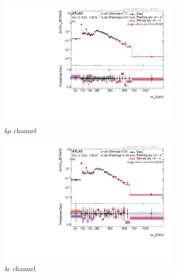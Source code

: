 \begin{figure}[H]
    \begin{subfigure}{.49\textwidth}\centering
      \includegraphics[width=.95\linewidth]{Figures/m4l/UnfoldedResults/linlog_Unfolded_Data_m4l_event_type4mu.pdf}\caption{$4\mu$ channel}\label{fig:sub-first}
    \end{subfigure}
    \begin{subfigure}{.49\textwidth}\centering
      \includegraphics[width=.95\linewidth]{Figures/m4l/UnfoldedResults/linlog_Unfolded_Data_m4l_event_type4e.pdf} \caption{$4e$ channel}\label{fig:sub-second}
    \end{subfigure}
    \begin{subfigure}{.49\textwidth}\centering

\end{subfigure}
\end{figure}
